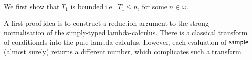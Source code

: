 \newcommand\transform[1]{{\ulcorner{#1}\urcorner}}

\iffalse
As before, fix a $M \in \Lambda^0$.
Recall the random variables on $(S, \calF, \mu)$:
\begin{align*}
T_0(s) & := 0 \\
T_{n+1}(s) & := \min \{ k \mid k>T_n(s), M_k(s) \textrm{ a value or of form } E[\tY \lambda x. N] \}
\end{align*}
\fi

\TnBounded*

We first show that $T_1$ is bounded i.e.~$T_1 \leq n$, for some $n \in \omega$.

A first proof idea is to construct a reduction argument to the strong normalisation of the simply-typed lambda-calculus.
 There is a classical transform of conditionals into the pure lambda-calculus.
However, each evaluation of $\mathsf{sample}$ (almost surely) returns a different number, which complicates such a transform.

